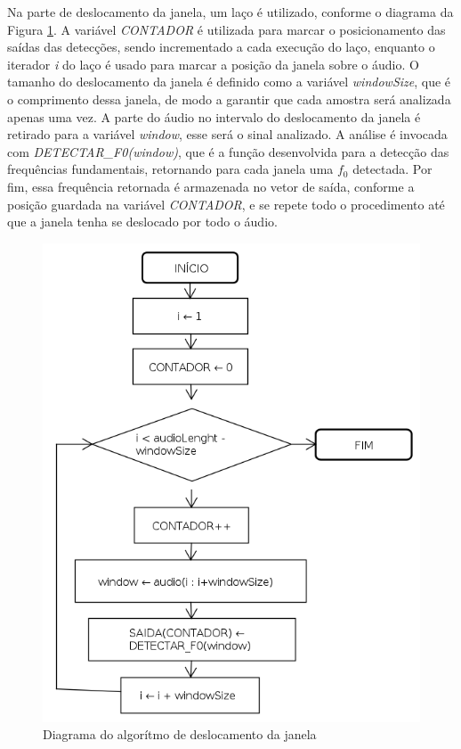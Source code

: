 Na parte de deslocamento da janela, um laço é utilizado, conforme o diagrama da Figura \ref{flowchart-deslocamento}. A variável \textit{CONTADOR} é utilizada para marcar o posicionamento das saídas das detecções, sendo incrementado a cada execução do laço, enquanto o iterador \textit{i} do laço é usado para marcar a posição da janela sobre o áudio. O tamanho do deslocamento da janela é definido como a variável \textit{windowSize}, que é o comprimento dessa janela, de modo a garantir que cada amostra será analizada apenas uma vez. A parte do áudio no intervalo do deslocamento da janela é retirado para a variável \textit{window}, esse será o sinal analizado. A análise é invocada com \textit{DETECTAR\_F0(window)}, que é a função desenvolvida para a detecção das frequências fundamentais, retornando para cada janela uma $f_0$ detectada. Por fim, essa frequência retornada é armazenada no vetor de saída, conforme a posição guardada na variável \textit{CONTADOR}, e se repete todo o procedimento até que a janela tenha se deslocado por todo o áudio.

\begin{figure}[h!]
	\centering
	\includegraphics[scale=1]{pasta1_figuras/deslocamento.png}
	\caption{Diagrama do algorítmo de deslocamento da janela}
	\label{flowchart-deslocamento}
\end{figure}

